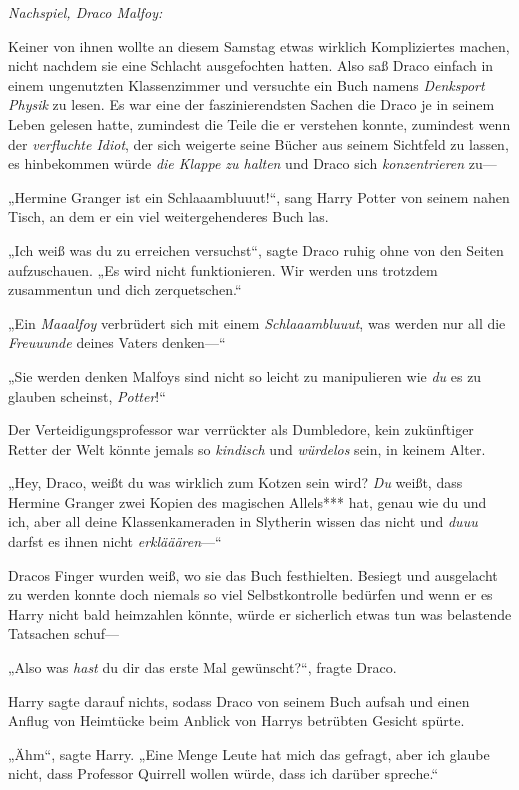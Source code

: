 {\emph{Nachspiel, Draco Malfoy:}

Keiner von ihnen wollte an diesem Samstag etwas wirklich Kompliziertes machen, nicht nachdem sie eine Schlacht ausgefochten hatten. Also saß Draco einfach in einem ungenutzten Klassenzimmer und versuchte ein Buch namens \emph{Denksport Physik} zu lesen. Es war eine der faszinierendsten Sachen die Draco je in seinem Leben gelesen hatte, zumindest die Teile die er verstehen konnte, zumindest wenn der \emph{verfluchte Idiot}, der sich weigerte seine Bücher aus seinem Sichtfeld zu lassen, es hinbekommen würde \emph{die Klappe zu halten} und Draco sich \emph{konzentrieren} zu—

„Hermine Granger ist ein Schlaaambluuut!“, sang Harry Potter von seinem nahen Tisch, an dem er ein viel weitergehenderes Buch las.

„Ich weiß was du zu erreichen versuchst“, sagte Draco ruhig ohne von den Seiten aufzuschauen. „Es wird nicht funktionieren. Wir werden uns trotzdem zusammentun und dich zerquetschen.“

„Ein \emph{Maaalfoy} verbrüdert sich mit einem \emph{Schlaaambluuut}, was werden nur all die \emph{Freuuunde} deines Vaters denken—“

„Sie werden denken Malfoys sind nicht so leicht zu manipulieren wie \emph{du} es zu glauben scheinst, \emph{Potter}!“

Der Verteidigungsprofessor war verrückter als Dumbledore, kein zukünftiger Retter der Welt könnte jemals so \emph{kindisch} und \emph{würdelos} sein, in keinem Alter.

„Hey, Draco, weißt du was wirklich zum Kotzen sein wird? \emph{Du} weißt, dass Hermine Granger zwei Kopien des magischen Allels*** hat, genau wie du und ich, aber all deine Klassenkameraden in Slytherin wissen das nicht und \emph{duuu} darfst es ihnen nicht \emph{erklääären}—“

Dracos Finger wurden weiß, wo sie das Buch festhielten. Besiegt und ausgelacht zu werden konnte doch niemals so viel Selbstkontrolle bedürfen und wenn er es Harry nicht bald heimzahlen könnte, würde er sicherlich etwas tun was belastende Tatsachen schuf—

„Also was \emph{hast} du dir das erste Mal gewünscht?“, fragte Draco.

Harry sagte darauf nichts, sodass Draco von seinem Buch aufsah und einen Anflug von Heimtücke beim Anblick von Harrys betrübten Gesicht spürte.

„Ähm“, sagte Harry. „Eine Menge Leute hat mich das gefragt, aber ich glaube nicht, dass Professor Quirrell wollen würde, dass ich darüber spreche.“

}
